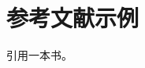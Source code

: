 \documentclass[UTF8,fontset=fandol]{ctexart}
\begin{document}
\section{参考文献示例}引用一本书\cite{knuth1984}。
\printbibliography
\end{document}
